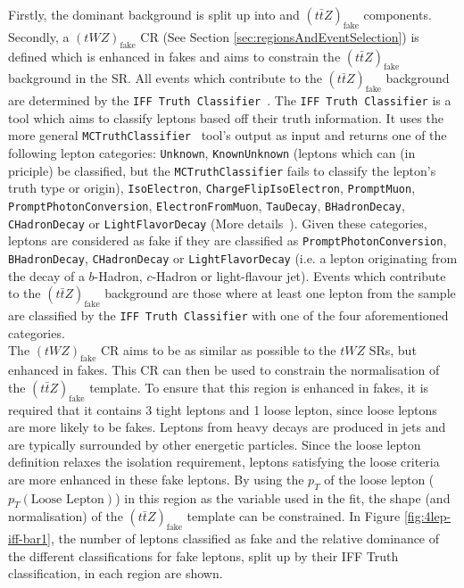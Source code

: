 Firstly, the dominant \ttZ background is split up into \ttZ and $(t\bar{t}Z)_{\text{fake}}$ components. Secondly, a $(tWZ)_{\text{fake}}$ CR (See Section \ref{sec:regionsAndEventSelection}) is defined which is enhanced in fakes and aims to constrain the $(t\bar{t}Z)_{\text{fake}}$ background in the SR. All events which contribute to the $(t\bar{t}Z)_{\text{fake}}$ background are determined by the \texttt{IFF Truth Classifier}~\cite{IFFTruthClassifier}. The \texttt{IFF Truth Classifier} is a tool which aims to classify leptons based off their truth information. It uses the more general \texttt{MCTruthClassifier}~\cite{MCTruthClassifier} tool's output as input and returns one of the following lepton categories: \texttt{Unknown}, \texttt{KnownUnknown} (leptons which can (in priciple) be classified, but the \texttt{MCTruthClassifier} fails to classify the lepton's truth type or origin), \texttt{IsoElectron}, \texttt{ChargeFlipIsoElectron}, \texttt{PromptMuon}, \texttt{PromptPhotonConversion}, \texttt{ElectronFromMuon}, \texttt{TauDecay}, \texttt{BHadronDecay}, \texttt{CHadronDecay} or \texttt{LightFlavorDecay} (More details~\cite{IFFTruthClassifier-leptonCategories}). Given these categories, leptons are considered as fake if they are classified as \texttt{PromptPhotonConversion}, \texttt{BHadronDecay}, \texttt{CHadronDecay} or \texttt{LightFlavorDecay} (i.e. a lepton originating from the decay of a $b$-Hadron, $c$-Hadron or light-flavour jet). Events which contribute to the $(t\bar{t}Z)_{\text{fake}}$ background are those where at least one lepton from the \ttZ sample are classified by the \texttt{IFF Truth Classifier} with one of the four aforementioned categories.\\

The $(tWZ)_{\text{fake}}$ CR aims to be as similar as possible to the $tWZ$ SRs, but enhanced in fakes. This CR can then be used to constrain the normalisation of the $(t\bar{t}Z)_{\text{fake}}$ template. To ensure that this region is enhanced in fakes, it is required that it contains 3 tight leptons and 1 loose lepton, since loose leptons are more likely to be fakes. Leptons from heavy decays are produced in jets and are typically surrounded by other energetic particles. Since the loose lepton definition relaxes the isolation requirement, leptons satisfying the loose criteria are more enhanced in these fake leptons. By using the $p_{T}$ of the loose lepton ($p_{T}(\text{Loose Lepton})$) in this region as the variable used in the fit, the shape (and normalisation) of the $(t\bar{t}Z)_{\text{fake}}$ template can be constrained. In Figure \ref{fig:4lep-iff-bar1}, the number of leptons classified as fake and the relative dominance of the different classifications for fake leptons, split up by their IFF Truth classification, in each region are shown.

